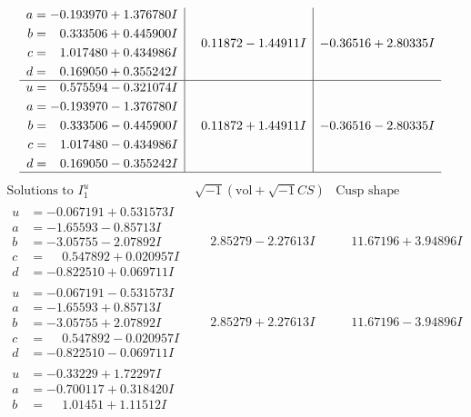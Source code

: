 \documentclass[1p]{elsarticle_modified}
\theoremstyle{definition}
\newcommand{\I}{\sqrt{-1}}
\begin{document}
$$\begin{array}{c|c|c}
\begin{aligned}
a &= -0.193970 + 1.376780 I \\
b &= \phantom{-}0.333506 + 0.445900 I \\
c &= \phantom{-}1.017480 + 0.434986 I \\
d &= \phantom{-}0.169050 + 0.355242 I\end{aligned}
 & \phantom{-}0.11872 - 1.44911 I & -0.36516 + 2.80335 I \\ \hline\begin{aligned}
u &= \phantom{-}0.575594 - 0.321074 I \\
a &= -0.193970 - 1.376780 I \\
b &= \phantom{-}0.333506 - 0.445900 I \\
c &= \phantom{-}1.017480 - 0.434986 I \\
d &= \phantom{-}0.169050 - 0.355242 I\end{aligned}
 & \phantom{-}0.11872 + 1.44911 I & -0.36516 - 2.80335 I\\
 \hline 
 \end{array}$$\newpage$$\begin{array}{c|c|c}  
\text{Solutions to }I^u_{1}& \I (\text{vol} + \sqrt{-1}CS) & \text{Cusp shape}\\
 \hline 
\begin{aligned}
u &= -0.067191 + 0.531573 I \\
a &= -1.65593 - 0.85713 I \\
b &= -3.05755 - 2.07892 I \\
c &= \phantom{-}0.547892 + 0.020957 I \\
d &= -0.822510 + 0.069711 I\end{aligned}
 & \phantom{-}2.85279 - 2.27613 I & \phantom{-}11.67196 + 3.94896 I \\ \hline\begin{aligned}
u &= -0.067191 - 0.531573 I \\
a &= -1.65593 + 0.85713 I \\
b &= -3.05755 + 2.07892 I \\
c &= \phantom{-}0.547892 - 0.020957 I \\
d &= -0.822510 - 0.069711 I\end{aligned}
 & \phantom{-}2.85279 + 2.27613 I & \phantom{-}11.67196 - 3.94896 I \\ \hline\begin{aligned}
u &= -0.33229 + 1.72297 I \\
a &= -0.700117 + 0.318420 I \\
b &= \phantom{-}1.01451 + 1.11512 I \\

\end{aligned}
\end{array}$$
\end{document}
